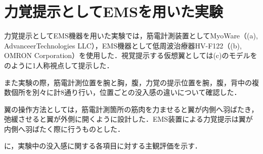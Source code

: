     \section{力覚提示としてEMSを用いた実験}


    力覚提示としてEMS機器を用いた実験では，筋電計測装置としてMyoWare（(a), AdvanceerTechnologies LLC），EMS機器として低周波治療器HV-F122（(b), OMRON Corporation）を使用した．視覚提示する仮想翼としては(c)のモデルをのように1人称視点して提示した．

    また実験の際，筋電計測位置を腕と胸，腹，力覚の提示位置を腕，腹，背中の複数個所を別々に計8通り行い，位置ごとの没入感の違いについて確認した．

    翼の操作方法としては，筋電計測箇所の筋肉を力ませると翼が内側へ羽ばたき，弛緩させると翼が外側に開くように設計した．EMS装置による力覚提示は翼が内側へ羽ばたく際に行うものとした．


    に，実験中の没入感に関する各項目に対する主観評価を示す．
    
